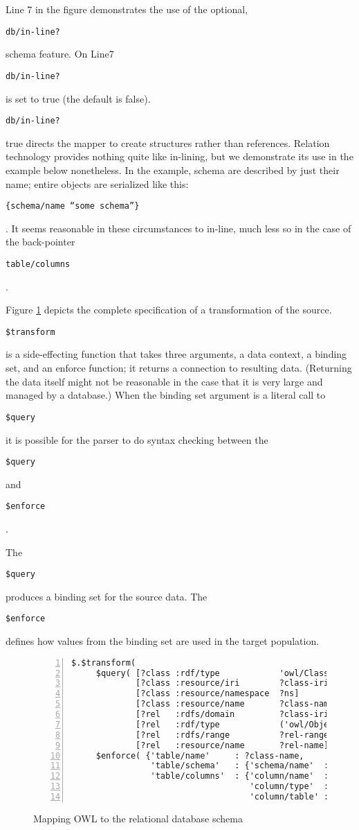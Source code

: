 \documentclass[9pt,letterpaper]{article}
\newcommand{\stt}[1]{\begin{footnotesize}\texttt{#1}\end{footnotesize}}
\begin{document}
Line 7 in the figure demonstrates the use of the optional, \stt{db/in-line?} schema feature.
On Line7 \stt{db/in-line?} is set to true (the default is false).
\stt{db/in-line?} true directs the mapper to create structures rather than references.
Relation technology provides nothing quite like in-lining, but we demonstrate its use in the example below nonetheless.
In the example, schema are described by just their name; entire objects are serialized like this: \stt{\{schema/name ``some schema''\}}.
It seems reasonable in these circumstances to in-line, much less so in the case of the back-pointer \stt{table/columns}.

Figure \ref{code:mapping-owl-to-rdbms} depicts the complete specification of a transformation of the source.
\stt{\$transform} is a side-effecting function that takes three arguments, a data context, a binding set, and an enforce function;
it returns a connection to resulting data.
(Returning the data itself might not be reasonable in the case that it is very large and managed by a database.)
When the binding set argument is a literal call to \stt{\$query} it is possible for the parser to do syntax checking between
the \stt{\$query} and \stt{\$enforce}.

The \stt{\$query} produces a binding set for the source data.
The \stt{\$enforce} defines how values from the binding set are used in the target population.

\begin{figure}[H]
  \caption{Mapping OWL to the relational database schema}
  \label{code:mapping-owl-to-rdbms}
\begin{lstlisting}[numberstyle=\scriptsize,basicstyle=\ttfamily\scriptsize,numbers=left,stepnumber=1,breaklines=true]
 $.$transform(
     $query( [?class :rdf/type            'owl/Class']
             [?class :resource/iri        ?class-iri]
             [?class :resource/namespace  ?ns]
             [?class :resource/name       ?class-name]
             [?rel   :rdfs/domain         ?class-iri]
             [?rel   :rdf/type            ('owl/ObjectProperty' or 'owl/DataProperty')]
             [?rel   :rdfs/range          ?rel-range]
             [?rel   :resource/name       ?rel-name])
     $enforce( {'table/name'     : ?class-name,
                'table/schema'   : {'schema/name'  : ?ns},
                'table/columns'  : {'column/name'  : ?rel-name,
                                    'column/type'  : ?rel-range,
                                    'column/table' : ?table-ent}} as ?table-ent))
\end{lstlisting}
\end{figure}
\end{document}
